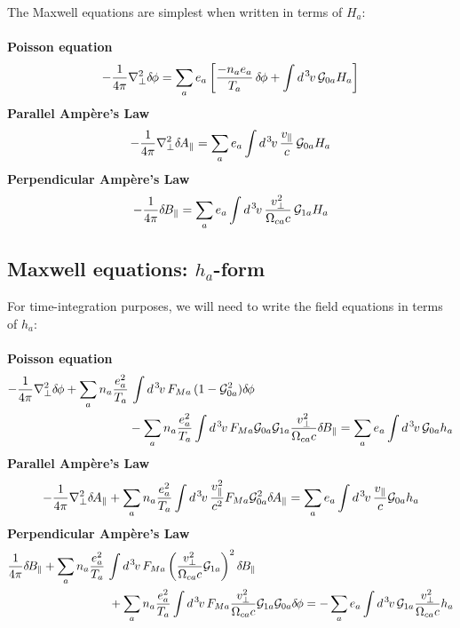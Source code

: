 The Maxwell equations are simplest when written in terms of $H_a$:\\
\\
{\bf Poisson equation}
%
\begin{equation}
- \frac{1}{4\pi} \nabla_\perp^2 \delta \hskip -1pt \phi = \sum_a e_a 
 \left[ \frac{-n_a e_a}{T_a} \, \delta \hskip -1pt \phi + \int d^{\hskip 1pt 3} \hskip -1pt v \, {\cal G}_{0a} H_a \right] 
\end{equation}
%
{\bf Parallel Amp\`ere's Law}
%
\begin{equation}
- \frac{1}{4\pi} \nabla_\perp^2 \delta \hskip -1pt A_\parallel = \sum_a e_a \int d^{\hskip 1pt 3} \hskip -1pt v \, \frac{v_\parallel}{c} 
 \, {\cal G}_{0a} H_a 
\end{equation}
%
{\bf Perpendicular Amp\`ere's Law}
%
\begin{equation}
- \frac{1}{4\pi} \delta \hskip -1pt B_\parallel = \sum_a e_a \int d^{\hskip 1pt 3} \hskip -1pt v \, \frac{v_\perp^2}{\Omega_{ca} c} 
 \, {\cal G}_{1a} H_a  
\end{equation}

\subsection{Maxwell equations: $h_a$-form}

For time-integration purposes, we will need to write the field equations 
in terms of $h_a$:\\
\\
{\bf Poisson equation}
%
\begin{align}
-\frac{1}{4 \pi} \nabla_\perp^2 \delta \hskip -1pt \phi 
+ \sum_a n_a \frac{e_a^2}{T_a} & \, \int d^{\hskip 1pt 3} \hskip -1pt v \, F_{Ma} \, (1-{\cal G}_{0a}^2) \delta \hskip -1pt \phi 
\nonumber \\
& - \sum_a n_a \frac{e_a^2}{T_a} \int d^{\hskip 1pt 3} \hskip -1pt v \, F_{Ma} {\cal G}_{0a} {\cal G}_{1a}
  \frac{v_\perp^2}{\Omega_{ca} c} \delta \hskip -1pt B_\parallel 
= \sum_a e_a \int d^{\hskip 1pt 3} \hskip -1pt v \, {\cal G}_{0a} h_a 
 \label{eq.maxp}
\end{align}
%
{\bf Parallel Amp\`ere's Law}
%
\begin{equation}
-\frac{1}{4 \pi} \nabla_\perp^2 \delta \hskip -1pt A_\parallel 
+ \sum_a n_a \frac{e_a^2}{T_a} \int d^{\hskip 1pt 3} \hskip -1pt v \, \frac{v_\parallel^2}{c^2} F_{Ma} {\cal G}_{0a}^2 \delta \hskip -1pt A_\parallel
= \sum_a e_a \int d^{\hskip 1pt 3} \hskip -1pt v \, \frac{v_\parallel}{c} {\cal G}_{0a} h_a 
 \label{eq.maxa1}
\end{equation}
%
{\bf Perpendicular Amp\`ere's Law}
%
\begin{align}
\frac{1}{4 \pi} \delta \hskip -1pt B_\parallel + \sum_a n_a \frac{e_a^2}{T_a} & \, \int d^{\hskip 1pt 3} \hskip -1pt v \, F_{Ma} 
\left( \frac{v_\perp^2}{\Omega_{ca} c} {\cal G}_{1a} \right)^2 \delta \hskip -1pt B_\parallel
\nonumber \\
&~ + \sum_a n_a \frac{e_a^2}{T_a} \int d^{\hskip 1pt 3} \hskip -1pt v \, F_{Ma} 
\frac{v_\perp^2}{\Omega_{ca} c} {\cal G}_{1a} {\cal G}_{0a} \delta \hskip -1pt \phi
= -\sum_a e_a \int d^{\hskip 1pt 3} \hskip -1pt v \, {\cal G}_{1a} \frac{v_\perp^2}{\Omega_{ca} c} h_a 
 \label{eq.maxa2}
\end{align}
%
